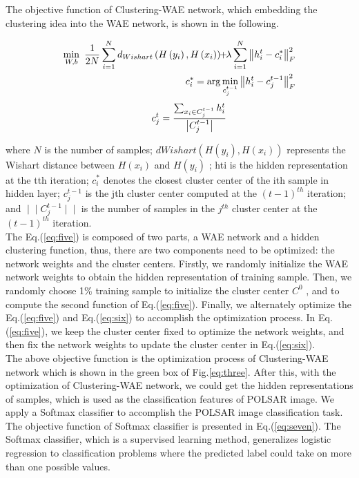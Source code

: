 \documentclass[11pt, a4paper, onecolumn, oneside]{article}
\begin{document}
The objective function of Clustering-WAE network, which embedding the clustering idea into the WAE network, is shown in the following.

\begin{equation} \label{eq:five}
\begin{split}
\min \limits _{W,b}~\frac {1}{2N}\sum \limits _{i = 1}^{N} {{d_{Wishart}}\left ({ {H\left ({ {y_{i}} }\right ),H\left ({ {x_{i}} }\right )} }\right )} \! \!+\! \!\lambda \sum \limits _{i = 1}^{N} {\left \|{ {h_{i}^{t} - c_{i}^{*}} }\right \|_{F}^{2}} \\
\hphantom {\min \limits _{W,b}~}c_{i}^{*} = \arg \min \limits _{c_{j}^{t - 1}} \left \|{ {h_{i}^{t} - c_{j}^{t - 1}} }\right \|_{F}^{2}
\end{split}
\end{equation}
\begin{equation} \label{eq:six}
\hphantom {\min \limits _{W,b}~}c_{j}^{t} = \frac {{\sum \nolimits _{x_{i} \in C_{j}^{t - 1}} {h_{i}^{t}} }}{{\left |{ {C_{j}^{t - 1}} }\right |}}
\end{equation}

where $N$ is the number of samples; $dWishart(H(y_i),H(x_i))$ represents the Wishart distance between $H(x_i)$ and $H(y_i)$ ; hti is the hidden representation at the tth iteration; $c_i^*$ denotes the closest cluster center of the ith sample in hidden layer; $c_j^{t-1}$ is the jth cluster center computed at the $(t-1)^{th}$ iteration; and $∣∣C_j^{t-1}∣∣$ is the number of samples in the $j^{th}$ cluster center at the $(t-1)^{th}$ iteration. \\

The Eq.(\ref{eq:five}) is composed of two parts, a WAE network and a hidden clustering function, thus, there are two components need to be optimized: the network weights and the cluster centers. Firstly, we randomly initialize the WAE network weights to obtain the hidden representation of training sample. Then, we randomly choose 1\% training sample to initialize the cluster center $C^0$ , and to compute the second function of Eq.(\ref{eq:five}). Finally, we alternately optimize the Eq.(\ref{eq:five}) and Eq.(\ref{eq:six}) to accomplish the optimization process. In Eq.(\ref{eq:five}), we keep the cluster center fixed to optimize the network weights, and then fix the network weights to update the cluster center in Eq.(\ref{eq:six}). \\

The above objective function is the optimization process of Clustering-WAE network which is shown in the green box of Fig.\ref{eq:three}. After this, with the optimization of Clustering-WAE network, we could get the hidden representations of samples, which is used as the classification features of POLSAR image. We apply a Softmax classifier \cite{z} to accomplish the POLSAR image classification task. The objective function of Softmax classifier is presented in Eq.(\ref{eq:seven}). The Softmax classifier, which is a supervised learning method, generalizes logistic regression to classification problems where the predicted label could take on more than one possible values.
\end{document}
